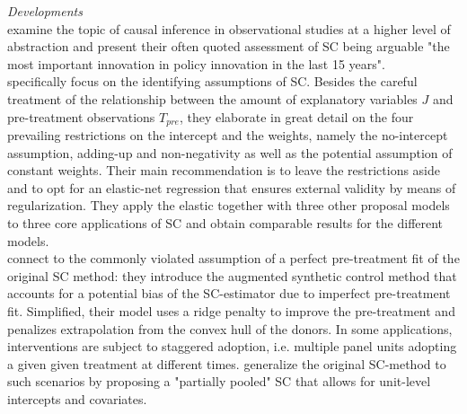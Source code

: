 \textit{Developments}\\
\cite{athey:2016} examine the topic of causal inference in observational studies at a higher level of abstraction and present their often quoted assessment of \ac{SC} being arguable "the most important innovation in policy innovation in the last 15 years". \\
\cite{doudchenko:2016} specifically focus on the identifying assumptions of \ac{SC}. Besides the careful treatment of the relationship between the amount of explanatory variables $J$ and pre-treatment observations $T_{pre}$, they elaborate in great detail on the four prevailing restrictions on the intercept and the weights, namely the no-intercept assumption, adding-up and non-negativity as well as the potential assumption of constant weights. Their main recommendation is to leave the restrictions aside and to opt for an elastic-net regression that ensures external validity by means of regularization. They apply the elastic together with three other proposal models to three core applications of \ac{SC} and obtain comparable results for the different models. \\
\cite{benmichael:2021a} connect to the commonly violated assumption of a perfect pre-treatment fit of the original \ac{SC} method: they introduce the augmented synthetic control method that accounts for a potential bias of the \ac{SC}-estimator due to imperfect pre-treatment fit. Simplified, their model uses a ridge penalty to improve the pre-treatment and penalizes extrapolation from the convex hull of the donors. In some applications, interventions are subject to staggered adoption, i.e. multiple panel units adopting a given given treatment at different times. \cite{benmichael:2021b} generalize the original \ac{SC}-method to such scenarios by proposing a "partially pooled" \ac{SC} that allows for unit-level intercepts and covariates.  

\cite{abadie:2019} \\
\cite{amjad:2018} \\
\cite{harvey:2020} \\
\cite{muhlbach:2019}

